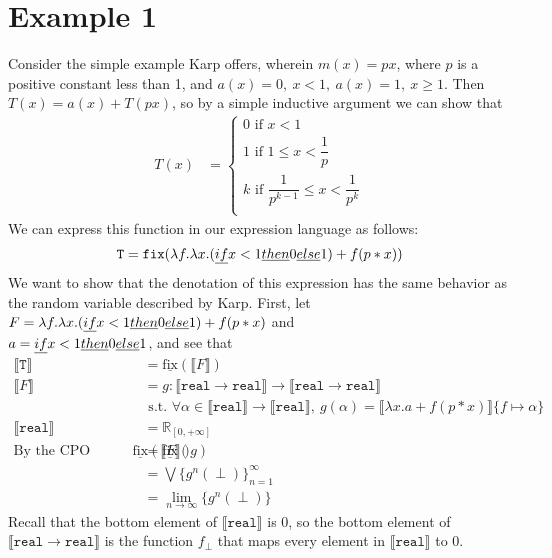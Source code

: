 \documentclass{westhesis}
\newcommand{\R}{\mathbb{R}}
\begin{document}
\section{Example 1}
Consider the simple example Karp offers, wherein $m(x) = px$, where $p$ is a positive constant less than 1, and $a(x) = 0, \ x < 1, \ a(x) = 1, \ x \geq 1$. Then $T(x) = a(x) + T(px)$, so by a simple inductive argument we can show that 
\begin{align*}
T(x) &= 
 \begin{cases}
 0 \text{ if } x < 1 \\
 1 \text{ if } 1 \leq x < \dfrac{1}{p} \\
 k \text{ if }  \dfrac{1}{p^{k-1}} \leq x < \dfrac{1}{p^k} \\
 \end{cases}
 \end{align*}
 We can express this function in our expression language as follows: 
 \begin{align*}
 \texttt{T} = \texttt{fix}(\lambda f. \lambda x. (\emph{if } x<1 \emph{ then } 0 \emph{ else } 1) + f (p * x))
 \end{align*}
 We want to show that the denotation of this expression has the same behavior as the random variable described by Karp. First, let $F = \lambda f. \lambda x. (\emph{if } x<1 \emph{ then } 0 \emph{ else } 1) + f (p * x)$ and \\ $a = \emph{if } x<1 \emph{ then } 0 \emph{ else } 1$, and see that 
 \begin{align*}
 \llbracket \texttt{T} \rrbracket &= \underline{\text{fix}}(\llbracket F \rrbracket) \\
 \llbracket F \rrbracket &= g : \llbracket \texttt{real} \rightarrow \texttt{real}\rrbracket \rightarrow \llbracket \texttt{real} \rightarrow \texttt{real}\rrbracket \\ &\text{ \ \ \ s.t. } \forall \alpha \in \llbracket \texttt{real}\rrbracket \rightarrow \llbracket \texttt{real}\rrbracket, \ 
 g(\alpha) = \llbracket \lambda x.a + f (p * x)\rrbracket\{f \mapsto \alpha\} \\
 \llbracket \texttt{real}\rrbracket &= \R_{[0, +\infty]}  
 \\\text{By the CPO fixpoint theorem, } \underline{\text{fix}}(\llbracket F \rrbracket) &= \underline{\text{fix}}(g) \\
&= \bigvee\{g^n (\perp)\}^{\infty}_{n=1} \\
&= \lim_{n \to \infty}\{g^n (\perp)\}
 \end{align*}
 Recall that the bottom element of $\llbracket \texttt{real} \rrbracket$ is $0$, so the bottom element of $\llbracket \texttt{real} \rightarrow \texttt{real}\rrbracket$ is the function $f_{\perp}$ that maps every element in $\llbracket \texttt{real} \rrbracket$ to $0$. 
\end{document}
